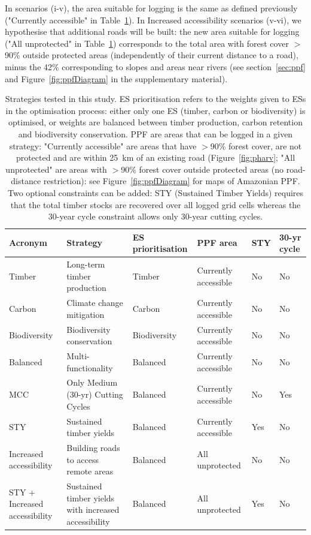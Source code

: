 \documentclass[12pt]{article}
\begin{document}
In scenarios (i-v), the area suitable for logging is the same as defined previously ("Currently accessible" in Table~\ref{tab:strategies}). In Increased accessibility scenarios (v-vi), we hypothesise that additional roads will be built: the new area suitable for logging ("All unprotected" in Table~\ref{tab:strategies}) corresponds to the total area with forest cover $>$90\% outside protected areas (independently of their current distance to a road), minus the 42\% corresponding to slopes and areas near rivers (see section~\ref{sec:ppf} and Figure~\ref{fig:ppfDiagram} in the supplementary material). 

\begin{table}
    \centering
    \begin{tabularx}{\textwidth}{p{2cm} p{4.5cm} p{2cm} p{3.5cm} p{0.8cm} p{1cm}}
    \toprule
         Acronym & Strategy & ES prioritisation & PPF area &  STY & 30-yr cycle \\
         \midrule
         Timber & Long-term timber production & Timber  & Currently accessible & No & No\\
         Carbon & Climate change mitigation &  Carbon & Currently accessible & No & No\\
         Biodiversity & Biodiversity conservation &  Biodiversity & Currently accessible & No & No \\
         Balanced & Multi-functionality & Balanced & Currently accessible & No & No \\
         MCC & Only Medium (30-yr) Cutting Cycles & Balanced & Currently accessible & No & Yes \\
         STY & Sustained timber yields & Balanced & Currently accessible & Yes & No \\
         Increased accessibility & Building roads to access remote areas & Balanced & All unprotected & No & No \\
         STY + Increased accessibility & Sustained timber yields with increased accessibility & Balanced & All unprotected & Yes & No \\
         \bottomrule
    \end{tabularx}
    \caption{Strategies tested in this study. ES prioritisation refers to the weights given to ESs in the optimisation process: either only one ES (timber, carbon or biodiversity) is optimised, or weights are balanced between timber production, carbon retention and biodiversity conservation. PPF are areas that can be logged in a given strategy: "Currently accessible" are areas that have $>$90\% forest cover, are not protected and are within 25~km of an existing road (Figure~\ref{fig:pharv}; "All unprotected" are areas with $>$90\% forest cover outside protected areas (no road-distance restriction): see Figure~\ref{fig:ppfDiagram} for maps of Amazonian PPF. Two optional constraints can be added: STY (Sustained Timber Yields) requires that the total timber stocks are recovered over all logged grid cells whereas the 30-year cycle constraint allows only 30-year cutting cycles.}
    \label{tab:strategies}
\end{table}
\end{document}
